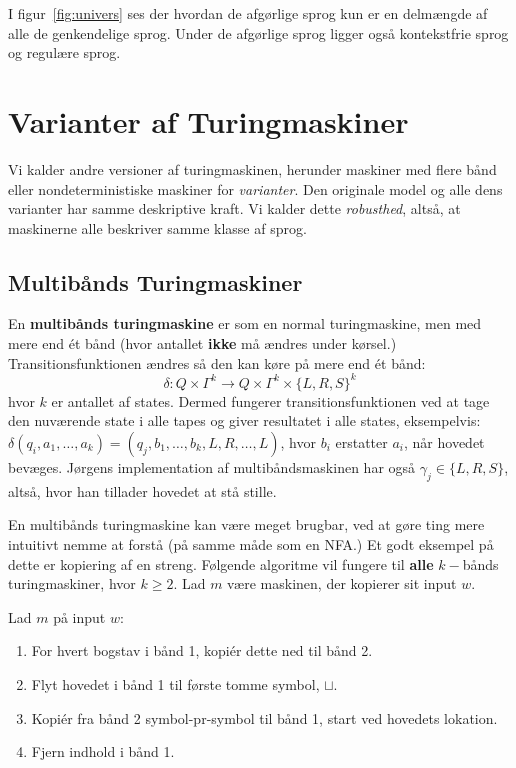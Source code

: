 I figur~\ref{fig:univers} ses der hvordan de afgørlige sprog kun er en delmængde af alle de genkendelige sprog. Under de afgørlige sprog ligger også kontekstfrie sprog og regulære sprog.

\section{Varianter af Turingmaskiner}%
\label{sec:turingvariants}

Vi kalder andre versioner af turingmaskinen, herunder maskiner med flere bånd eller nondeterministiske maskiner for \textit{varianter}. Den originale model og alle dens varianter har samme deskriptive kraft. Vi kalder dette \textit{robusthed}, altså, at maskinerne alle beskriver samme klasse af sprog.

\subsection{Multibånds Turingmaskiner}%
\label{subsec:multitape}

En \textbf{multibånds turingmaskine} er som en normal turingmaskine, men med mere end ét bånd (hvor antallet \textbf{ikke} må ændres under kørsel.) Transitionsfunktionen ændres så den kan køre på mere end ét bånd:
\[ \delta : Q \times \Gamma^{k} \longrightarrow Q \times \Gamma^{k} \times \{L,R,S\}^{k}\] hvor $k$ er antallet af states. Dermed fungerer transitionsfunktionen ved at tage den nuværende state i alle tapes og giver resultatet i alle states, eksempelvis: $\delta(q_{i}, a_{1}, \ldots, a_{k}) = (q_{j}, b_{1}, \ldots, b_{k}, L, R, \ldots, L)$, hvor $b_{i}$ erstatter $a_{i}$, når hovedet bevæges. Jørgens implementation af multibåndsmaskinen har også $\gamma_{j} \in \{L, R, S\}$, altså, hvor han tillader hovedet at stå stille.

En multibånds turingmaskine kan være meget brugbar, ved at gøre ting mere intuitivt nemme at forstå (på samme måde som en NFA.) Et godt eksempel på dette er kopiering af en streng. Følgende algoritme vil fungere til \textbf{alle} $k-$bånds turingmaskiner, hvor $k \ge 2$. Lad $m$ være maskinen, der kopierer sit input $w$.

Lad $m$ på input $w$:
\begin{enumerate}
	\item For hvert bogstav i bånd 1, kopiér dette ned til bånd 2.
	\item Flyt hovedet i bånd 1 til første tomme symbol, $\sqcup$.
	\item Kopiér fra bånd 2 symbol-pr-symbol til bånd 1, start ved hovedets lokation.
	\item Fjern indhold i bånd 1.
\end{enumerate}

